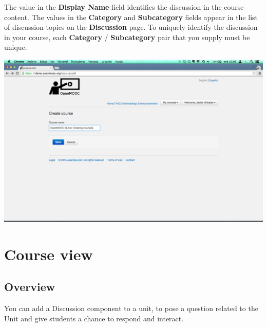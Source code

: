 \documentclass[letterpaper,10pt,english]{sphinxmanual}
\begin{document}
\begin{enumerate}
The value in the \textbf{Display Name} field identifies the discussion in the
course content. The values in the \textbf{Category} and \textbf{Subcategory} fields
appear in the list of discussion topics on the \textbf{Discussion} page. To
uniquely identify the discussion in your course, each \textbf{Category} /
\textbf{Subcategory} pair that you supply must be unique.

\includegraphics{3_create_course-3.png}

\end{enumerate}


\chapter{Course view}
\label{course_view:course-view}\label{course_view::doc}\label{course_view:id1}

\section{Overview}
\label{course_view:overview}
You can add a Discussion component to a unit, to pose a question related to the
Unit and give students a chance to respond and interact.
\end{document}

